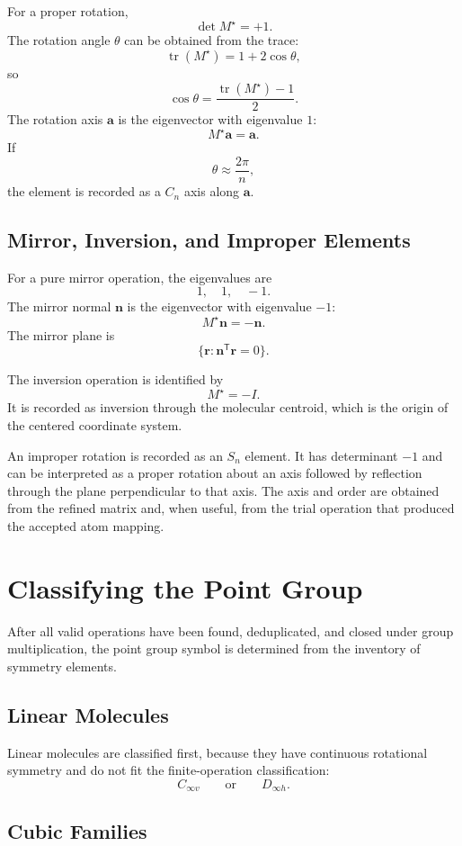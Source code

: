 \documentclass[11pt]{article}
\newcommand{\T}{\mathsf{T}}
\begin{document}
For a proper rotation,
\[
    \det M^\star=+1.
\]
The rotation angle \(\theta\) can be obtained from the trace:
\[
    \operatorname{tr}(M^\star)=1+2\cos\theta,
\]
so
\[
    \cos\theta=
    \frac{\operatorname{tr}(M^\star)-1}{2}.
\]
The rotation axis \(\mathbf a\) is the eigenvector with eigenvalue \(1\):
\[
    M^\star\mathbf a=\mathbf a.
\]
If
\[
    \theta\approx\frac{2\pi}{n},
\]
the element is recorded as a \(C_n\) axis along \(\mathbf a\).

\subsection{Mirror, Inversion, and Improper Elements}

For a pure mirror operation, the eigenvalues are
\[
    1,\quad 1,\quad -1.
\]
The mirror normal \(\mathbf n\) is the eigenvector with eigenvalue \(-1\):
\[
    M^\star\mathbf n=-\mathbf n.
\]
The mirror plane is
\[
    \{\mathbf r:\mathbf n^{\T}\mathbf r=0\}.
\]

The inversion operation is identified by
\[
    M^\star=-I.
\]
It is recorded as inversion through the molecular centroid, which is the origin
of the centered coordinate system.

An improper rotation is recorded as an \(S_n\) element.  It has determinant
\(-1\) and can be interpreted as a proper rotation about an axis followed by
reflection through the plane perpendicular to that axis.  The axis and order are
obtained from the refined matrix and, when useful, from the trial operation that
produced the accepted atom mapping.

\section{Classifying the Point Group}

After all valid operations have been found, deduplicated, and closed under
group multiplication, the point group symbol is determined from the inventory of
symmetry elements.

\subsection{Linear Molecules}

Linear molecules are classified first, because they have continuous rotational
symmetry and do not fit the finite-operation classification:
\[
    C_{\infty v}
    \qquad\text{or}\qquad
    D_{\infty h}.
\]

\subsection{Cubic Families}
\end{document}
